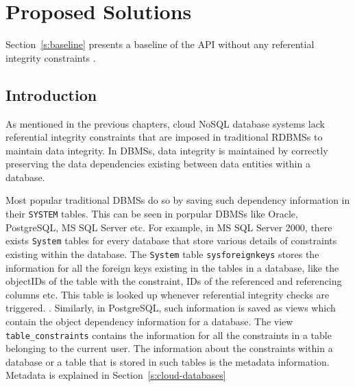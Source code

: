 \chapter{Proposed Solutions} \label{c:solutions}

Section~\ref{s:baseline} presents a baseline of
the \ac{API} without any referential integrity constraints
.


\section{Introduction}

As mentioned in the previous chapters, cloud \ac{NoSQL} database systems lack
referential integrity constraints that are imposed in traditional \acp{RDBMS} to
maintain data integrity. In \acp{DBMS}, data integrity is maintained by
correctly preserving the data dependencies existing between data entities within
a database.

Most popular traditional \acp{DBMS} do so by saving such dependency information
in their \texttt{SYSTEM} tables. This can be seen in porpular \acp{DBMS} like
Oracle, PostgreSQL, MS SQL Server etc. For example, in MS SQL Server 2000, there
exists \texttt{System} tables for every database that store various details of
constraints existing within the database. The \texttt{System} table
\texttt{sysforeignkeys} stores the information for all the foreign keys existing
in the tables in a database, like the objectIDs of the table with the constraint,
IDs of the referenced and referencing columns etc. This table is looked up
whenever referential integrity checks are triggered. \citep{sys:msdn}.
Similarly, in PostgreSQL, such information is saved as views which contain the
object dependency information for a database. The view
\texttt{table\_constraints} contains the information for all the constraints in
a table belonging to the current user.%
The information about the constraints within a database or a table that is
stored in such tables is the metadata information. Metadata is explained in
 Section~\ref{s:cloud-databases}

